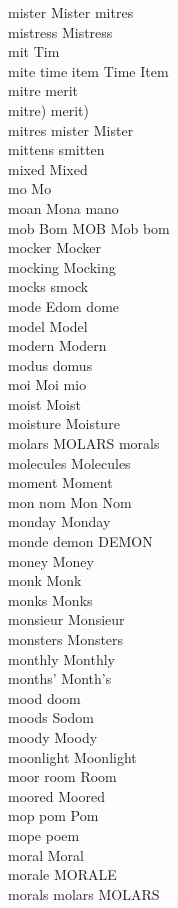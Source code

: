mister Mister mitres\\
mistress Mistress\\
mit Tim\\
mite time item Time Item\\
mitre merit\\
mitre) merit)\\
mitres mister Mister\\
mittens smitten\\
mixed Mixed\\
mo Mo\\
moan Mona mano\\
mob Bom MOB Mob bom\\
mocker Mocker\\
mocking Mocking\\
mocks smock\\
mode Edom dome\\
model Model\\
modern Modern\\
modus domus\\
moi Moi mio\\
moist Moist\\
moisture Moisture\\
molars MOLARS morals\\
molecules Molecules\\
moment Moment\\
mon nom Mon Nom\\
monday Monday\\
monde demon DEMON\\
money Money\\
monk Monk\\
monks Monks\\
monsieur Monsieur\\
monsters Monsters\\
monthly Monthly\\
months' Month's\\
mood doom\\
moods Sodom\\
moody Moody\\
moonlight Moonlight\\
moor room Room\\
moored Moored\\
mop pom Pom\\
mope poem\\
moral Moral\\
morale MORALE\\
morals molars MOLARS\\
